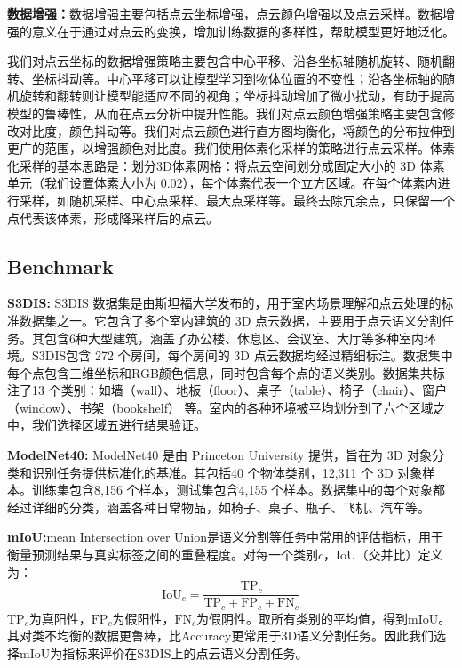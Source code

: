 \documentclass[preprint,12pt]{elsarticle}
\begin{document}
\textbf{数据增强：}数据增强主要包括点云坐标增强，点云颜色增强以及点云采样。数据增强的意义在于通过对点云的变换，增加训练数据的多样性，帮助模型更好地泛化。

我们对点云坐标的数据增强策略主要包含中心平移、沿各坐标轴随机旋转、随机翻转、坐标抖动等。中心平移可以让模型学习到物体位置的不变性；沿各坐标轴的随机旋转和翻转则让模型能适应不同的视角；坐标抖动增加了微小扰动，有助于提高模型的鲁棒性，从而在点云分析中提升性能。我们对点云颜色增强策略主要包含修改对比度，颜色抖动等。我们对点云颜色进行直方图均衡化，将颜色的分布拉伸到更广的范围，以增强颜色对比度。我们使用体素化采样的策略进行点云采样。体素化采样的基本思路是：划分3D体素网格：将点云空间划分成固定大小的 3D 体素单元（我们设置体素大小为 0.02），每个体素代表一个立方区域。在每个体素内进行采样，如随机采样、中心点采样、最大点采样等。最终去除冗余点，只保留一个点代表该体素，形成降采样后的点云。


\subsection{Benchmark}
\textbf{S3DIS:}
S3DIS 数据集是由斯坦福大学发布的，用于室内场景理解和点云处理的标准数据集之一。它包含了多个室内建筑的 3D 点云数据，主要用于点云语义分割任务。其包含6种大型建筑，涵盖了办公楼、休息区、会议室、大厅等多种室内环境。S3DIS包含 272 个房间，每个房间的 3D 点云数据均经过精细标注。数据集中每个点包含三维坐标和RGB颜色信息，同时包含每个点的语义类别。数据集共标注了13 个类别：如墙（wall）、地板（floor）、桌子（table）、椅子（chair）、窗户（window）、书架（bookshelf） 等。室内的各种环境被平均划分到了六个区域之中，我们选择区域五进行结果验证。


\textbf{ModelNet40:}
ModelNet40 是由 Princeton University 提供，旨在为 3D 对象分类和识别任务提供标准化的基准。其包括40 个物体类别，12,311 个 3D 对象样本。训练集包含8,156 个样本，测试集包含4,155 个样本。数据集中的每个对象都经过详细的分类，涵盖各种日常物品，如椅子、桌子、瓶子、飞机、汽车等。


\textbf{mIoU:}mean Intersection over Union是语义分割等任务中常用的评估指标，用于衡量预测结果与真实标签之间的重叠程度。对每一个类别$c$，IoU（交并比）定义为：\begin{equation}\mathrm{IoU}_c=\frac{\mathrm{TP}_c}{\mathrm{TP}_c+\mathrm{FP}_c+\mathrm{FN}_c}\end{equation}
$\mathrm{TP}_{c}$为真阳性，$\mathrm{FP}_{c}$为假阳性，$\mathrm{FN}_{c}$为假阴性。取所有类别的平均值，得到mIoU。其对类不均衡的数据更鲁棒，比Accuracy更常用于3D语义分割任务。因此我们选择mIoU为指标来评价在S3DIS上的点云语义分割任务。
\end{document}
